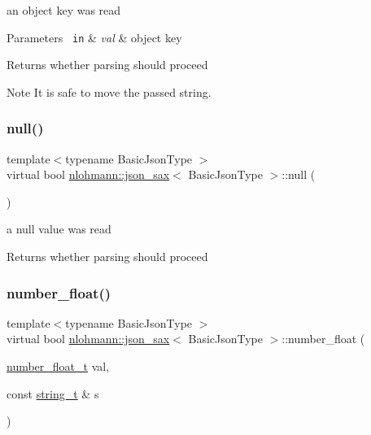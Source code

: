 an object key was read 


\begin{DoxyParams}[1]{Parameters}
\mbox{\texttt{ in}}  & {\em val} & object key \\
\hline
\end{DoxyParams}
\begin{DoxyReturn}{Returns}
whether parsing should proceed 
\end{DoxyReturn}
\begin{DoxyNote}{Note}
It is safe to move the passed string. 
\end{DoxyNote}
\mbox{\label{structnlohmann_1_1json__sax_a0ad26edef3f8d530dcec3192bba82df6}} 
\subsubsection{\texorpdfstring{null()}{null()}}
{\footnotesize\ttfamily template$<$typename Basic\+Json\+Type $>$ \\
virtual bool \mbox{\hyperlink{structnlohmann_1_1json__sax}{nlohmann\+::json\+\_\+sax}}$<$ Basic\+Json\+Type $>$\+::null (\begin{DoxyParamCaption}{ }\end{DoxyParamCaption})\hspace{0.3cm}{\ttfamily [pure virtual]}}



a null value was read 

\begin{DoxyReturn}{Returns}
whether parsing should proceed 
\end{DoxyReturn}
\mbox{\label{structnlohmann_1_1json__sax_ae7c31614e8a82164d2d7f8dbf4671b25}} 
\subsubsection{\texorpdfstring{number\_float()}{number\_float()}}
{\footnotesize\ttfamily template$<$typename Basic\+Json\+Type $>$ \\
virtual bool \mbox{\hyperlink{structnlohmann_1_1json__sax}{nlohmann\+::json\+\_\+sax}}$<$ Basic\+Json\+Type $>$\+::number\+\_\+float (\begin{DoxyParamCaption}\item[{\mbox{\hyperlink{structnlohmann_1_1json__sax_a390c209bffd8c4800c8f3076dc465a20}{number\+\_\+float\+\_\+t}}}]{val,  }\item[{const \mbox{\hyperlink{structnlohmann_1_1json__sax_ae01977a9f3c5b3667b7a2929ed91061e}{string\+\_\+t}} \&}]{s }\end{DoxyParamCaption})\hspace{0.3cm}{\ttfamily [pure virtual]}}



